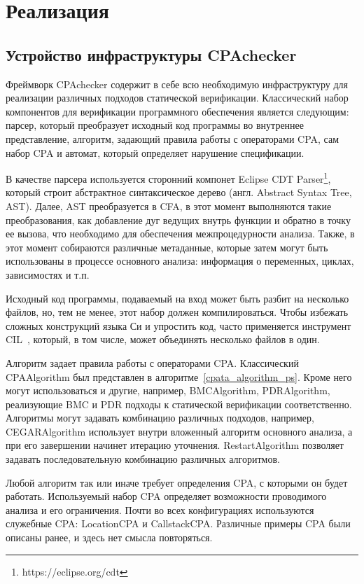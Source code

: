 \chapter{Реализация}
\label{chapter_implementation}

\section{Устройство инфраструктуры CPAchecker}
\label{sect_impl_cpachecker}

Фреймворк CPAchecker содержит в себе всю необходимую инфраструктуру для реализации различных подходов статической верификации.
Классический набор компонентов для верификации программного обеспечения является следующим: парсер, который преобразует исходный код программы во внутреннее представление, алгоритм, задающий правила работы с операторами CPA, сам набор CPA и автомат, который определяет нарушение спецификации.

В качестве парсера используется сторонний компонет Eclipse CDT Parser\footnote{https://eclipse.org/cdt}, который строит абстрактное синтаксическое дерево (англ. Abstract Syntax Tree, AST).
Далее, AST преобразуется в CFA, в этот момент выполняются такие преобразования, как добавление дуг ведущих внутрь функции и обратно в точку ее вызова, что необходимо для обеспечения межпроцедурности анализа.
Также, в этот момент собираются различные метаданные, которые затем могут быть использованы в процессе основного анализа: информация о переменных, циклах, зависимостях и т.п.

Исходный код программы, подаваемый на вход может быть разбит на несколько файлов, но, тем не менее, этот набор должен компилироваться.
Чтобы избежать сложных конструкций языка Си и упростить код, часто применяется инструмент CIL~\cite{CIL}, который, в том числе, может объединять несколько файлов в один.

Алгоритм задает правила работы с операторами CPA. Классический CPAAlgorithm был представлен в алгоритме~\ref{cpata_algorithm_ps}.
Кроме него могут использоваться и другие, например, BMCAlgorithm, PDRAlgorithm, реализующие BMC и PDR подходы к статической верификации соответственно.
Алгоритмы могут задавать комбинацию различных подходов, например, CEGARAlgorithm использует внутри вложенный алгоритм основного анализа, а при его завершении начинет итерацию уточнения.
RestartAlgorithm позволяет задавать последовательную комбинацию различных алгоритмов.

Любой алгоритм так или иначе требует определения CPA, с которыми он будет работать.
Используемый набор CPA определяет возможности проводимого анализа и его ограничения.
Почти во всех конфигурациях используются служебные CPA: LocationCPA и CallstackCPA. 
Различные примеры CPA были описаны ранее, и здесь нет смысла повторяться.

